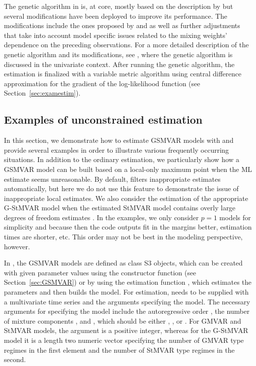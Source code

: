 \documentclass[nojss]{jss}
\begin{document}
The genetic algorithm in  is, at core, mostly based on the description by \cite{Dorsey+Mayer:1995} but several modifications have been deployed to improve its performance. The modifications include the ones proposed by \cite{Patnaik+Srinivas:1994} and \cite{Smith+Dike+Stegmann:1995} as well as further adjustments that take into account model specific issues related to the mixing weights' dependence on the preceding observations. For a more detailed description of the genetic algorithm and its modifications, see \citet[Appendix A]{Virolainen:2021}, where the genetic algorithm is discussed in the univariate context. After running the genetic algorithm, the estimation is finalized with a variable metric algorithm \cite[algorithm 21, implemented by \citealp{R}]{Nash:1990} using central difference approximation for the gradient of the log-likelihood function (see Section~\ref{sec:examestim}).

\subsection{Examples of unconstrained estimation}\label{sec:example_estim}

In this section, we demonstrate how to estimate GSMVAR models with  and provide several examples in order to illustrate various frequently occurring situations. In addition to the ordinary estimation, we particularly show how a GSMVAR model can be built based on a local-only maximum point when the ML estimate seems unreasonable. By default,  filters inappropriate estimates automatically, but here we do not use this feature to demonstrate the issue of inappropriate local estimates. We also consider the estimation of the appropriate G-StMVAR model when the estimated StMVAR model contains overly large degrees of freedom estimates \citep[see the related discussion in][]{Virolainen2:2021}. In the examples, we only consider $p=1$ models for simplicity and because then the code outputs fit in the margins better, estimation times are shorter, etc. This order may not be best in the modeling perspective, however.

In , the GSMVAR models are defined as class  S3 objects, which can be created with given parameter values using the constructor function  (see Section~\ref{sec:GSMVAR}) or by using the estimation function , which estimates the parameters and then builds the model. For estimation,  needs to be supplied with a multivariate time series and the arguments specifying the model. The necessary arguments for specifying the model include the autoregressive order , the number of mixture components , and , which should be either , , or . For GMVAR and StMVAR models, the argument  is a positive integer, whereas for the G-StMVAR model it is a length two numeric vector specifying the number of GMVAR type regimes in the first element and the number of StMVAR type regimes in the second.
\end{document}
